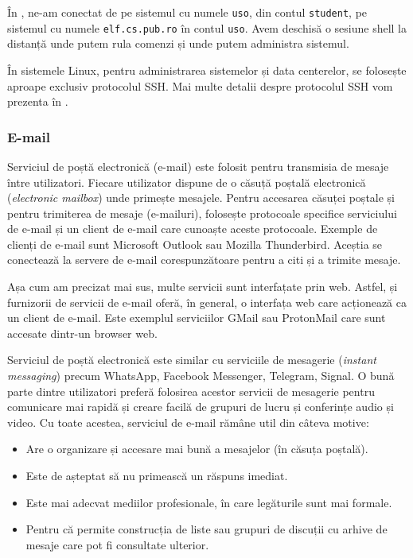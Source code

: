 În , ne-am conectat de pe sistemul cu numele \texttt{uso}, din contul \texttt{student}, pe sistemul cu numele \texttt{elf.cs.pub.ro} în contul \texttt{uso}.
Avem deschisă o sesiune shell la distanță unde putem rula comenzi și unde putem administra sistemul.

În sistemele Linux, pentru administrarea sistemelor și data centerelor, se folosește aproape exclusiv protocolul SSH.
Mai multe detalii despre protocolul SSH vom prezenta în .

\subsubsection{E-mail}
\label{sec:net:apps:other:e-mail}

Serviciul de poștă electronică (e-mail) este folosit pentru transmisia de mesaje între utilizatori.
Fiecare utilizator dispune de o căsuță poștală electronică (\textit{electronic mailbox}) unde primește mesajele.
Pentru accesarea căsuței poștale și pentru trimiterea de mesaje (e-mailuri), folosește protocoale specifice serviciului de e-mail și un client de e-mail care cunoaște aceste protocoale.
Exemple de clienți de e-mail sunt Microsoft Outlook sau Mozilla Thunderbird.
Aceștia se conectează la servere de e-mail corespunzătoare pentru a citi și a trimite mesaje.

Așa cum am precizat mai sus, multe servicii sunt interfațate prin web.
Astfel, și furnizorii de servicii de e-mail oferă, în general, o interfața web care acționează ca un client de e-mail.
Este exemplul serviciilor GMail sau ProtonMail care sunt accesate dintr-un browser web.

Serviciul de poștă electronică este similar cu serviciile de mesagerie (\textit{instant messaging}) precum WhatsApp, Facebook Messenger, Telegram, Signal.
O bună parte dintre utilizatori preferă folosirea acestor servicii de mesagerie pentru comunicare mai rapidă și creare facilă de grupuri de lucru și conferințe audio și video.
Cu toate acestea, serviciul de e-mail rămâne util din câteva motive:
\begin{itemize}
  \item Are o organizare și accesare mai bună a mesajelor (în căsuța poștală).
  \item Este de așteptat să nu primească un răspuns imediat.
  \item Este mai adecvat mediilor profesionale, în care legăturile sunt mai formale.
  \item Pentru că permite construcția de liste sau grupuri de discuții cu arhive de mesaje care pot fi consultate ulterior.
\end{itemize}


